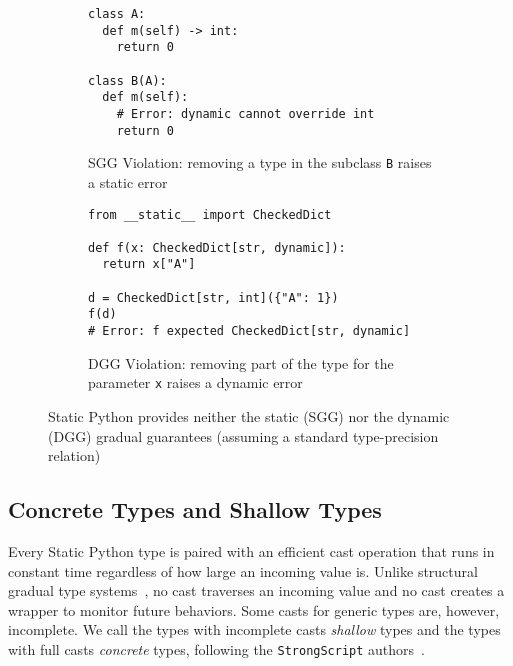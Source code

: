 \documentclass[english,cleveref,crc]{programming}
\newcommand{\SP}{Static Python}
\newcommand{\code}[1]{\texttt{#1}}
\begin{document}
\begin{figure}
  \begin{subfigure}[t]{0.48\columnwidth}
    \begin{lstlisting}
class A:
  def m(self) -> int:
    return 0

class B(A):
  def m(self):
    # Error: dynamic cannot override int
    return 0
  \end{lstlisting}
    \caption{SGG Violation: removing a type in the subclass \code{B} raises a static error}
    \label{f:gg-failure-stat}
  \end{subfigure}
  \hfill
  \begin{subfigure}[t]{0.48\columnwidth}
  \begin{lstlisting}
from __static__ import CheckedDict

def f(x: CheckedDict[str, dynamic]):
  return x["A"]

d = CheckedDict[str, int]({"A": 1})
f(d)
# Error: f expected CheckedDict[str, dynamic]
  \end{lstlisting}
    \caption{DGG Violation: removing part of the type for the parameter \code{x} raises a dynamic error}
    \label{f:gg-failure-dyn}
  \end{subfigure}
  \caption{\SP{} provides neither the static (SGG) nor the dynamic (DGG) gradual guarantees (assuming a standard type-precision relation)}
  \label{fig:gg-failure}
\end{figure}



\subsection{Concrete Types and Shallow Types}
\label{s:checked-type}

Every \SP{} type is paired with an efficient cast operation that runs in
constant time regardless of how large an incoming value is.
Unlike structural gradual type systems~\cite{gtnffvf-jfp-2019},
no cast traverses an incoming value and no cast creates a wrapper
to monitor future behaviors.
Some casts for generic types are, however, incomplete.
We call the types with incomplete casts \emph{shallow} types
and the types with full casts \emph{concrete} types, following
the \code{StrongScript} authors~\cite{rzv-ecoop-2015}.
\end{document}
